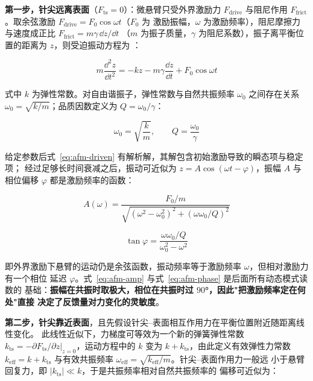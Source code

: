 \begin{principle}
\textbf{第一步，针尖远离表面}（$F_{\mathrm{ts}}=0$）：微悬臂只受外界激励力 $F_{\mathrm{drive}}$
与阻尼作用 $F_{\mathrm{frict}}$。取余弦激励 $F_{\mathrm{drive}}=F_0\cos\omega t$（$F_0$ 为
激励振幅，$\omega$ 为激励频率），阻尼摩擦力与速度成正比 $F_{\mathrm{frict}}=m\gamma\,\dd z/\dd t$
（$m$ 为振子质量，$\gamma$ 为阻尼系数），振子离平衡位置的距离为 $z$，则受迫振动方程为
：
\end{principle}

\begin{equation}\label{eq:afm-driven}
m\frac{\dd^{2}z}{\dd t^{2}}=-kz-m\gamma\frac{\dd z}{\dd t}+F_0\cos\omega t
\end{equation}

式中 $k$ 为弹性常数。对自由谐振子，弹性常数与自然共振频率 $\omega_0$ 之间存在关系
$\omega_0=\sqrt{k/m}$；品质因数定义为 $Q=\omega_0/\gamma$：

\begin{equation}\label{eq:afm-q}
\omega_0=\sqrt{\frac{k}{m}},\qquad Q=\frac{\omega_0}{\gamma}
\end{equation}

给定参数后式~\eqref{eq:afm-driven} 有解析解，其解包含初始激励导致的瞬态项与稳定项；
经过足够长时间衰减之后，振动可近似为 $z=A\cos(\omega t-\varphi)$，振幅 $A$ 与相位偏移
$\varphi$ 都是激励频率的函数：

\begin{equation}\label{eq:afm-amp}
A(\omega)=\frac{F_0/m}{\sqrt{\left(\omega^{2}-\omega_0^{2}\right)^{2}+\left(\omega\omega_0/Q\right)^{2}}}
\end{equation}

\begin{equation}\label{eq:afm-phase}
\tan\varphi=\frac{\omega\omega_0/Q}{\omega_0^{2}-\omega^{2}}
\end{equation}

即外界激励下悬臂的运动仍是余弦函数，振动频率等于激励频率 $\omega$，但相对激励力有一个相位
延迟 $\varphi$。式~\eqref{eq:afm-amp} 与式~\eqref{eq:afm-phase} 是后面所有动态模式读数的
基础：\textbf{振幅在共振时取极大，相位在共振时过 $90$°，因此"把激励频率定在何处"直接
决定了反馈量对力变化的灵敏度}。

\textbf{第二步，针尖靠近表面}，且先假设针尖--表面相互作用力在平衡位置附近随距离线性变化。
此线性近似下，力梯度可等效为一个新的弹簧弹性常数
$k_{\mathrm{ts}}=-\left.\partial F_{\mathrm{ts}}/\partial z\right|_{z=0}$，运动方程中的
$k$ 变为 $k+k_{\mathrm{ts}}$，由此定义有效弹性力常数 $k_{\mathrm{eff}}=k+k_{\mathrm{ts}}$
与有效共振频率 $\omega_{\mathrm{eff}}=\sqrt{k_{\mathrm{eff}}/m}$。针尖--表面作用力一般远
小于悬臂回复力，即 $\left|k_{\mathrm{ts}}\right|\ll k$，于是共振频率相对自然共振频率的
偏移可近似为：

